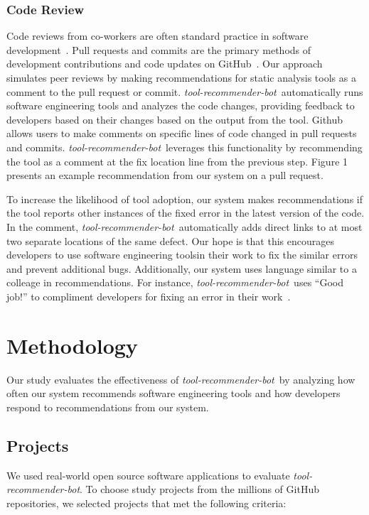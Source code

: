 \documentclass[sigconf,review,anonymous]{acmart}
\newcommand{\tool}{\textsl{tool-recommender-bot}}
\begin{document}
\subsubsection{Code Review}

Code reviews from co-workers are often standard practice in software development~\cite{CBirdCodeReviewingTrenches}. Pull requests and commits are the primary methods of development contributions and code updates on GitHub~\cite{PullRequestReview}. Our approach simulates peer reviews by making recommendations for static analysis tools as a comment to the pull request or commit. \tool~automatically runs software engineering tools and analyzes the code changes, providing feedback to developers based on their changes based on the output from the tool. Github allows users to make comments on specific lines of code changed in pull requests and commits. \tool~leverages this functionality by recommending the tool as a comment at the fix location line from the previous step. Figure 1 presents an example recommendation from our system on a pull request. %

To increase the likelihood of tool adoption, our system makes recommendations if the tool reports other instances of the fixed error in the latest version of the code. In the comment, \tool~automatically adds direct links to at most two separate locations of the same defect. Our hope is that this encourages developers to use software engineering toolsin their work to fix the similar errors and prevent additional bugs. Additionally, our system uses language similar to a colleage in recommendations. For instance, \tool~uses ``Good job!'' to compliment developers for fixing an error in their work~\cite{?}.

\section{Methodology}

Our study evaluates the effectiveness of \tool~by analyzing how often our system recommends software engineering tools and how developers respond to recommendations from our system.

\subsection{Projects}

We used real-world open source software applications to evaluate \tool. To choose study projects from the millions of GitHub repositories, we selected projects that met the following criteria:
\end{document}
